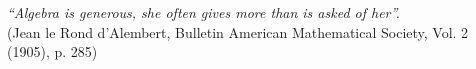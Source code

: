 \vspace*{\fill}
\begin{flushright}
    \textit{``Algebra is generous, she often gives more than is asked of her''.}\\
    (Jean le Rond d'Alembert, Bulletin American Mathematical Society, Vol. 2 (1905), p. 285)
\end{flushright}